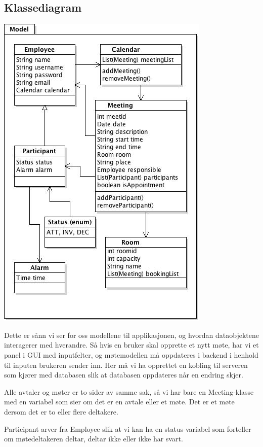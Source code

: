 
\subsection{Klassediagram}


\includegraphics[width=\textwidth]{klassediagram.jpg}

Dette er sånn vi ser for oss modellene til applikasjonen, og hvordan dataobjektene interagerer med hverandre. Så hvis en bruker skal opprette et nytt møte, har vi et panel i GUI med inputfelter, og møtemodellen må oppdateres i backend i henhold til inputen brukeren sender inn. Her må vi ha opprettet en kobling til serveren som kjører med databasen slik at databasen oppdateres når en endring skjer. 

Alle avtaler og møter er to sider av samme sak, så vi har bare en Meeting-klasse med en variabel som sier om det er en avtale eller et møte. Det er et møte dersom det er to eller flere deltakere. 

Participant arver fra Employee slik at vi kan ha en status-variabel som forteller om møtedeltakeren deltar, deltar ikke eller ikke har svart. 

